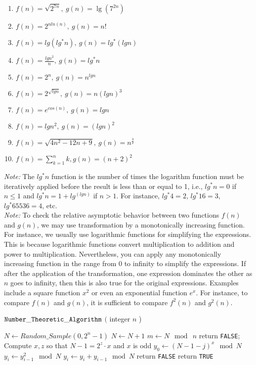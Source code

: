 \documentclass{article}
\begin{document}
\begin{enumerate}
\item $f(n) = \sqrt{2^{7n}},\ g(n) = \lg({7^{2n}})$
\item $f(n) = 2^{nln(n)},\ g(n) = n!$
\item $f(n) = lg(lg^*n),\  g(n) = lg^*(lgn)$
\item $f(n) = \frac{lgn^2}{n},\ g(n) = lg^*n$
\item $f(n) = 2^n,\ g(n) = n^{lgn}$
\item $f(n) = 2^{\sqrt{lgn}},\ g(n) = n(lgn)^3$
\item $f(n) = e^{cos(n)},\ g(n) = lgn$
\item $f(n) = lgn^2,\ g(n) = (lgn)^2$
\item $f(n) = \sqrt{4n^2 - 12n + 9},\ g(n) = n^{\frac{3}{2}}$
\item $f(n) = \sum_{k=1}^{n} k, g(n) = (n+2)^2$
\end{enumerate}

\noindent \emph{Note:} The $lg^*n$ function is the number of times the
logarithm function must be iteratively applied before the result is
less than or equal to 1, i.e., $lg^*n = 0$ if $n \leq 1$ and $lg^*n =
1 + lg^(lgn)$ if $n > 1$. For instance, $lg^*4=2$, $lg^*16=3$,
$lg^*65536=4$, etc.\\

\noindent \emph{Note:} To check the relative asymptotic behavior
between two functions $f(n)$ and $g(n)$, we may use transformation by
a monotonically increasing function. For instance, we usually use
logarithmic functions for simplifying the expressions. This is because
logarithmic functions convert multiplication to addition and power to
multiplication. Nevertheless, you can apply any monotonically
increasing function in the range from 0 to infinity to simplify the
expressions. If after the application of the transformation, one
expression dominates the other as $n$ goes to infinity, then this is
also true for the original expressions. Examples include a square
function $x^2$ or even an exponential function $e^x$. For instance, to
compare $f(n)$ and $g(n)$, it is sufficient to compare $f^2(n)$ and
$g^2(n)$.

\begin{algorithm}[h]
\caption{${\tt Number\_Theoretic\_Algorithm}$ $($ integer $n$ ) }
\label{algo}
$N \leftarrow Random\_Sample( 0, 2^n-1)$\;
{
  $N \leftarrow N + 1$\;
}
$m \leftarrow N \mod\ n$\;
{
  {
    return {\tt FALSE};
  }
  Compute $x,z$ so that $N - 1 = 2^z \cdot x$ and $x$ is odd\;
  $y_0 \leftarrow (N-1-j)^x \mod N$\;
  {
    $y_i \leftarrow y_{i-1}^2 \mod N$\;
    $y_i \leftarrow y_i + y_{i-1} \mod N$\;
  }
  {
    return {\tt FALSE}\;
  }
}
return {\tt TRUE}\;
\end{algorithm}
\end{document}
